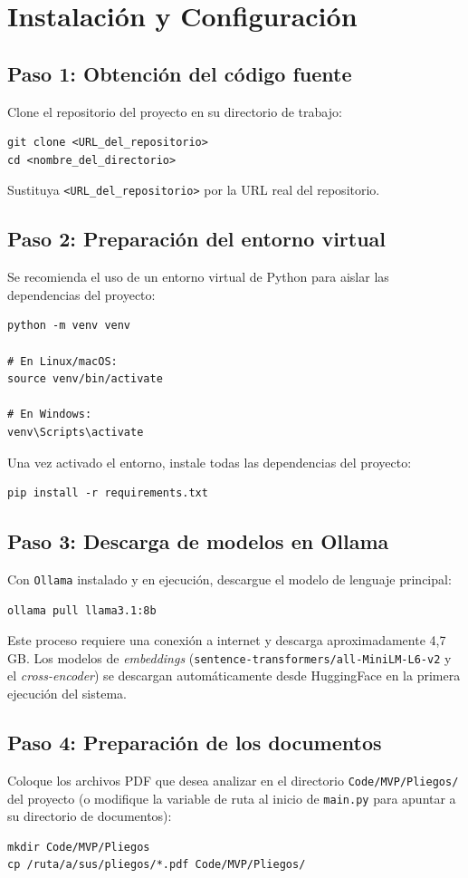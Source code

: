 \section{Instalación y Configuración}

\subsection{Paso 1: Obtención del código fuente}
Clone el repositorio del proyecto en su directorio de trabajo:
\begin{verbatim}
git clone <URL_del_repositorio>
cd <nombre_del_directorio>
\end{verbatim}
Sustituya \texttt{<URL\_del\_repositorio>} por la URL real del repositorio.

\subsection{Paso 2: Preparación del entorno virtual}
Se recomienda el uso de un entorno virtual de Python para aislar las dependencias del proyecto:
\begin{verbatim}
python -m venv venv

# En Linux/macOS:
source venv/bin/activate

# En Windows:
venv\Scripts\activate
\end{verbatim}
Una vez activado el entorno, instale todas las dependencias del proyecto:
\begin{verbatim}
pip install -r requirements.txt
\end{verbatim}

\subsection{Paso 3: Descarga de modelos en Ollama}
Con \texttt{Ollama} instalado y en ejecución, descargue el modelo de lenguaje principal:
\begin{verbatim}
ollama pull llama3.1:8b
\end{verbatim}
Este proceso requiere una conexión a internet y descarga aproximadamente 4,7 GB. Los modelos de \textit{embeddings} (\texttt{sentence-transformers/all-MiniLM-L6-v2} y el \textit{cross-encoder}) se descargan automáticamente desde HuggingFace en la primera ejecución del sistema.

\subsection{Paso 4: Preparación de los documentos}
Coloque los archivos PDF que desea analizar en el directorio \texttt{Code/MVP/Pliegos/} del proyecto (o modifique la variable de ruta al inicio de \texttt{main.py} para apuntar a su directorio de documentos):
\begin{verbatim}
mkdir Code/MVP/Pliegos
cp /ruta/a/sus/pliegos/*.pdf Code/MVP/Pliegos/
\end{verbatim}

